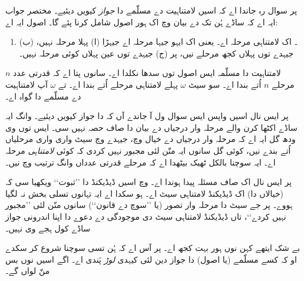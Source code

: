 \documentclass[../../../include/open-logic-section]{subfiles}
\begin{document}
پر سوال رہ جاندا اے کہ اسیں لامتناہیت دے مسلّمے دا \emph{جواز} کیویں دیئیے۔
مختصر جواب ایہ اے کہ ساڈے ہُن تک دے بیان وچ اک ہور اصول شامل کرنا پئے گا۔
اصول ایہ اے:
\begin{enumerate}
	\item[] \stagesinf۔ اک لامتناہی مرحلہ اے۔ یعنی اک ایہو جیہا مرحلہ اے جیہڑا (ا) پہلا مرحلہ نہیں، (ب) جیہدے توں پہلاں کجھ مرحلے نیں، پر (ج) جیہدے توں عین پہلاں کوئی مرحلہ نہیں۔
\end{enumerate}
لامتناہیت دا مسلّمہ ایس اصول توں سدھا نکلدا اے۔ سانوں پتا اے کہ قدرتی عدد
$n$ مرحلے $n$ اُتے بندا اے۔ سو سیٹ $\omega$ پہلے لامتناہی مرحلے اُتے
بندا اے۔ تے $\omega$ آپ لامتناہیت دے مسلّمے دا گواہ اے۔

پر ایس نال اسیں واپس ایس سوال ول آ جاندے آں کہ \stagesinf دا جواز
کیویں دیئیے۔ \stagessucc وانگ ایہ ساڈے اکٹھا کرن والے مرحلہ وار درجیاں
دے بیان دا صاف حصہ نہیں سی۔ ایس توں وی ودھ گل ایہ اے کہ مرحلہ وار درجیاں
دے خیال وچ، جیہدے وچ سیٹ واری واری مرحلیاں اُتے بندے نیں، کوئی گل سانوں
ایہ منّن لئی مجبور نہیں کردی کہ کوئی \emph{لامتناہی} مرحلہ اے۔ ایہ سوچنا
بالکل ٹھیک بیٹھدا اے کہ مرحلے قدرتی عدداں وانگ ترتیب وچ نیں۔

پر ایس نال اک صاف مسئلہ پیدا ہوندا اے۔ 
وچ اسیں ڈیڈیکنڈ دا ’’ثبوت‘‘ ویکھیا سی کہ (خیالاں دا) اک ڈیڈیکنڈ لامتناہی
سیٹ اے۔ ہو سکدا اے ایہ تہانوں تسلی بخش نہ لگیا ہووے۔ پر جے سیٹ دا مرحلہ
وار تصور (یا ’’سوچ دے قانون‘‘) سانوں \stagesinf{} منّن لئی ’’مجبور نہیں
کردے‘‘، تاں ڈیڈیکنڈ لامتناہی سیٹ دی موجودگی دے دعوے دا اپنا اندرونی جواز
ساڈے کول ہجے وی نہیں۔

بے شک ایتھے کہن نوں ہور بہت کجھ اے۔ پر آس اے کہ ہُن تسی سوچنا شروع کر
سکدے او کہ کسے مسلّمے (یا اصول) دا جواز دین لئی کیہدی \emph{لوڑ} پَندی اے۔
اگے اسیں \stagesinf{} نوں بس منّ لواں گے۔
\end{document}
